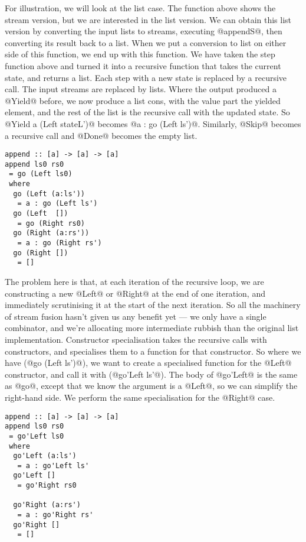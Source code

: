 For illustration, we will look at the list case. The function above shows the stream version, but we are interested in the list version.
We can obtain this list version by converting the input lists to streams, executing @appendS@, then converting its result back to a list.
When we put a conversion to list on either side of this function, we end up with this function.
We have taken the step function above and turned it into a recursive function that takes the current state, and returns a list.
Each step with a new state is replaced by a recursive call.
The input streams are replaced by lists.
Where the output produced a @Yield@ before, we now produce a list cons, with the value part the yielded element, and the rest of the list is the recursive call with the updated state.
So @Yield a (Left stateL')@ becomes @a : go (Left ls')@.
Similarly, @Skip@ becomes a recursive call and @Done@ becomes the empty list.


\begin{lstlisting}
append :: [a] -> [a] -> [a]
append ls0 rs0
 = go (Left ls0)
 where
  go (Left (a:ls'))
   = a : go (Left ls')
  go (Left  [])
   = go (Right rs0)
  go (Right (a:rs'))
   = a : go (Right rs')
  go (Right [])
   = []
\end{lstlisting}

The problem here is that, at each iteration of the recursive loop, we are constructing a new @Left@ or @Right@ at the end of one iteration, and immediately scrutinising it at the start of the next iteration.
So all the machinery of stream fusion hasn't given us any benefit yet --- we only have a single combinator, and we're allocating more intermediate rubbish than the original list implementation.
Constructor specialisation takes the recursive calls with constructors, and specialises them to a function for that constructor.
So where we have (@go (Left ls')@), we want to create a specialised function for the @Left@ constructor, and call it with (@go'Left ls'@).
The body of @go'Left@ is the same as @go@, except that we know the argument is a @Left@, so we can simplify the right-hand side.
We perform the same specialisation for the @Right@ case.

\begin{lstlisting}
append :: [a] -> [a] -> [a]
append ls0 rs0
 = go'Left ls0
 where
  go'Left (a:ls')
   = a : go'Left ls'
  go'Left []
   = go'Right rs0

  go'Right (a:rs')
   = a : go'Right rs'
  go'Right []
   = []
\end{lstlisting}


